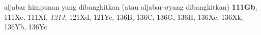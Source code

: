 



































aljabar himpunan yang dibangkitkan (atau aljabar-$\sigma$\nobreak yang dibangkitkan) {\bf 111Gb}, 111Xe, 111Xf,
{\it 121J}, 121Xd, 121Yc, 136B, 136C, 136G, 136H, 136Xc, 136Xk,
136Yb, 136Yc
































































